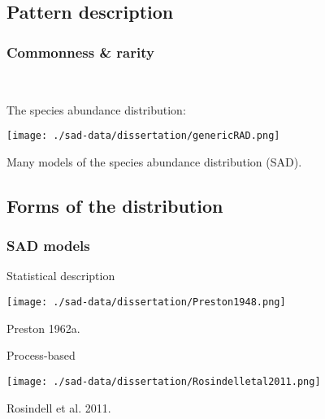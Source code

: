 \documentclass[14pt]{beamer}
\begin{document}
\subsection{Pattern description}
\begin{frame}[t]{}
\frametitle{Commonness \& rarity}
~\\
\begin{large}
The species abundance distribution:
\end{large}
\begin{center}
\texttt{[image: ./sad-data/dissertation/genericRAD.png]}\\
\end{center}
Many models of the species abundance distribution (SAD).
\end{frame}

\subsection{Forms of the distribution}
\begin{frame}[t]
\frametitle{SAD models}
Statistical description\\
\begin{center}  
\texttt{[image: ./sad-data/dissertation/Preston1948.png]}
\begin{tiny}
Preston 1962a.\\
\end{tiny}
\end{center}
Process-based\\
\begin{center}
\texttt{[image: ./sad-data/dissertation/Rosindelletal2011.png]}
\begin{tiny}
Rosindell et al. 2011.\\
\end{tiny}
\end{center}
\end{frame}
 
\end{document}
